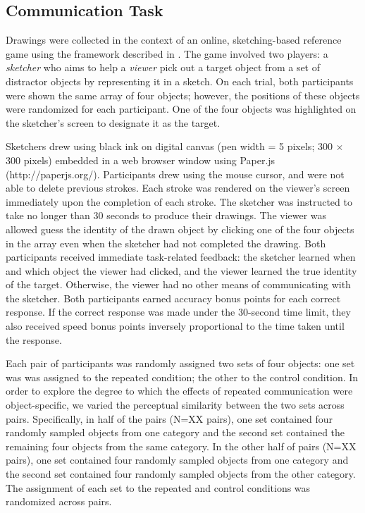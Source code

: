 \documentclass[10pt,letterpaper]{article}
\begin{document}
\subsection{Communication Task}

Drawings were collected in the context of an online, sketching-based reference game using the framework described in . 
The game involved two players: a \textit{sketcher} who aims to help a \textit{viewer} pick out a target object from a set of distractor objects by representing it in a sketch. 
On each trial, both participants were shown the same array of four objects; however, the positions of these objects were randomized for each participant. 
One of the four objects was highlighted on the sketcher's screen to designate it as the target.

Sketchers drew using black ink on digital canvas (pen width = 5 pixels; 300 $\times$ 300 pixels) embedded in a web browser window using Paper.js (http://paperjs.org/). 
Participants drew using the mouse cursor, and were not able to delete previous strokes. Each stroke was rendered on the viewer's screen immediately upon the completion of each stroke. 
The sketcher was instructed to take no longer than 30 seconds to produce their drawings. 
The viewer was allowed guess the identity of the drawn object by clicking one of the four objects in the array even when the sketcher had not completed the drawing. 
Both participants received immediate task-related feedback: the sketcher learned when and which object the viewer had clicked, and the viewer learned the true identity of the target. 
Otherwise, the viewer had no other means of communicating with the sketcher. 
Both participants earned accuracy bonus points for each correct response. 
If the correct response was made under the 30-second time limit, they also received speed bonus points inversely proportional to the time taken until the response.



Each pair of participants was randomly assigned two sets of four objects: one set was was assigned to the repeated condition; the other to the control condition.
In order to explore the degree to which the effects of repeated communication were object-specific, we varied the perceptual similarity between the two sets across pairs. 
Specifically, in half of the pairs (N=XX pairs), one set contained four randomly sampled objects from one category and the second set contained the remaining four objects from the same category. 
In the other half of pairs (N=XX pairs), one set contained four randomly sampled objects from one category and the second set contained four randomly sampled objects from the other category.
The assignment of each set to the repeated and control conditions was randomized across pairs. 
\end{document}
